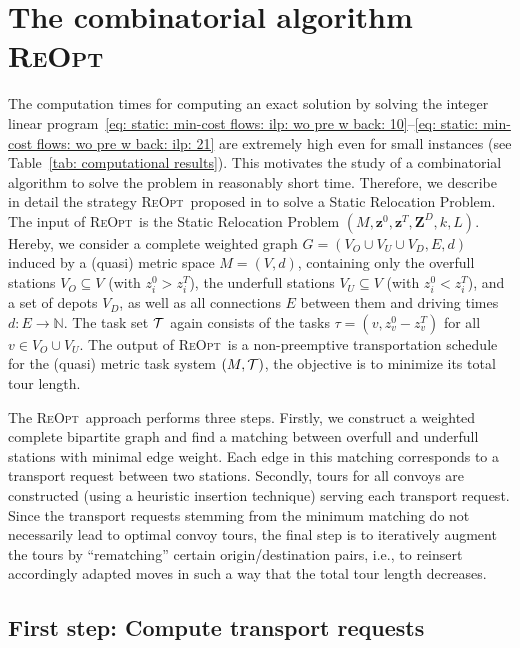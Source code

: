 \documentclass[english]{llncs}
\numberwithin{sublemma}{lemma}
\newcommand{\NN}{\ensuremath{\mathbb{N}}}
\newcommand{\capd}{\ensuremath{L}}
\newcommand{\z}{\boldsymbol{z}}
\newcommand{\zd}{\boldsymbol{Z}^D} \newcommand{\zzd}{Z^D}
\newcommand{\REOPT}{\textsc{ReOpt}\xspace}
\newcommand{\VO}{V_O}
\newcommand{\VU}{V_U}
\newcommand{\VD}{V_D}
\begin{document}
\section{The combinatorial algorithm \REOPT}
\label{sec: static: reopt}

The computation times for computing an exact solution by solving the integer linear program~\eqref{eq: static: min-cost flows: ilp: wo pre w back: 10}--\eqref{eq: static: min-cost flows: wo pre w back: ilp: 21}
are extremely high even for small instances (see Table~\ref{tab: computational results}).
This motivates the study of a combinatorial algorithm to solve the problem in reasonably short time.
Therefore, we describe in detail the strategy \REOPT\ proposed in \cite{LAGOS2013} to solve a Static Relocation Problem.
The input of \REOPT\ is the Static Relocation Problem $(M, \z^0, \z^T, \zd, k, \capd)$.
Hereby, we consider a complete weighted graph $G = (\VO \cup \VU \cup \VD, E, d)$ induced by a (quasi) metric space $M = (V, d)$, containing only the overfull stations $\VO \subseteq V$ (with $z_i^0 > z_i^T$),
the underfull stations $\VU \subseteq V$ (with $z_i^0 < z_i^T$), and a set of depots $\VD$, as well as all connections $E$ between them and driving times $d \colon E \to \NN$.
The task set ${\cal T}$ again consists of the tasks $\tau = (v, z_v^0 - z_v^T)$ for all $v \in \VO \cup \VU$.
The output of \REOPT\ is a non-preemptive transportation schedule for the (quasi) metric task system $(M, {\cal T})$, the objective is to minimize its total tour length.

The \REOPT\ approach performs three steps.
Firstly, we construct a weighted complete bipartite graph and find a matching between overfull and underfull stations with minimal edge weight.
Each edge in this matching corresponds to a transport request between two stations.
Secondly, tours for all convoys are constructed (using a heuristic insertion technique) serving each transport request.
Since the transport requests stemming from the minimum matching do not necessarily lead to optimal convoy tours, 
the final step is to iteratively augment the tours by ``rematching'' certain origin/destination pairs, i.e., to reinsert accordingly adapted moves in such a way that the total tour length decreases.



\subsection{First step: Compute transport requests}
\label{sec: static: reopt: first step}
\end{document}
